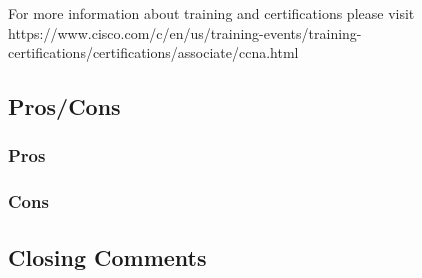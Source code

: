 For more information about training and certifications please visit https://www.cisco.com/c/en/us/training-events/training-certifications/certifications/associate/ccna.html
\subsection{Pros/Cons}

\subsubsection{Pros}

\subsubsection{Cons}

\subsection{Closing Comments}
